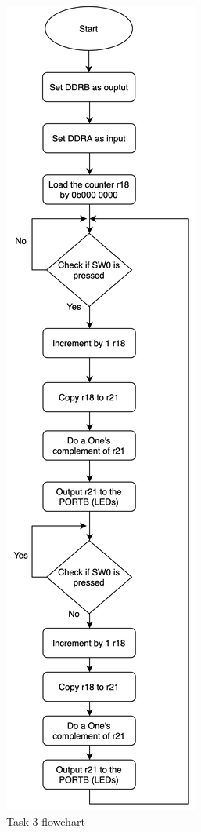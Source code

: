 \documentclass[a4paper,12pt]{article}
\begin{document}
\begin{figure}
\begin{center}
\includegraphics[width=\textwidth/3 ]{flowchart/task3_flowchart.png}
\end{center}
\caption{Task 3 flowchart}
\label{task3}
\end{figure}
\end{document}
